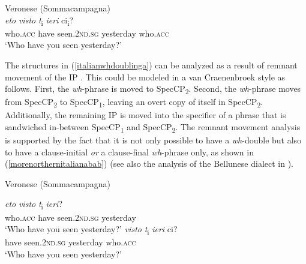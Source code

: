 \begin{exe}
\ex Veronese (Sommacampagna) \\
 {\textit{eto}} {\textit{visto}} {\textit{t}\textsubscript{i}} {\textit{ieri}} {{ci}\textsubscript{i}?}  \\
{who.\textsc{acc}} {have} {seen.\textsc{2nd.sg}} {} {yesterday} {who.\textsc{acc}} \\
\trans `Who have you seen yesterday?' \label{italianwhdoublinga}


\end{exe}



\noindent The structures in (\ref{italianwhdoublinga}) can be analyzed as a result of remnant movement of the IP \citep{poletto2005wh}. This could be modeled in a van Craenenbroek style as follows. First, the \textit{wh}-phrase is moved to SpecCP\textsubscript{2}. Second, the \textit{wh}-phrase moves from SpecCP\textsubscript{2} to SpecCP\textsubscript{1}, leaving an overt copy of itself in SpecCP\textsubscript{2}. Additionally, the remaining IP is moved into the specifier of a phrase that is sandwiched in-between SpecCP\textsubscript{1} and SpecCP\textsubscript{2}. The remnant movement analysis is supported by the fact that it is not only possible to have a \textit{wh}-double but also to have a clause-initial \textit{or} a clause-final \textit{wh}-phrase only, as shown in (\ref{morenorthernitalianabab}) (see also the analysis of the Bellunese dialect in \citealt{munaro1999sintagmi, munaro1999underspecified, poletto2000left}).


\begin{exe}
\ex Veronese (Sommacampagna)\label{morenorthernitalianabab}

\begin{xlist}

\ex{} {\textit{eto}} {\textit{visto}} {\textit{t}\textsubscript{i}} {\textit{ieri}?}  \\
{who.\textsc{acc}} {have} {seen.\textsc{2nd.sg}} {} {yesterday} \\
\trans `Who have you seen yesterday?' \label{morenorthernitalianababaaaa}
\ex{} {\textit{visto}}  {\textit{t}\textsubscript{i}} {\textit{ieri}} {ci?}  \\
{have} {seen.\textsc{2nd.sg}} {} {yesterday} {who.\textsc{acc}} \\
\trans `Who have you seen yesterday?' \label{morenorthernitalianabababaabb}
\end{xlist}
\end{exe}




